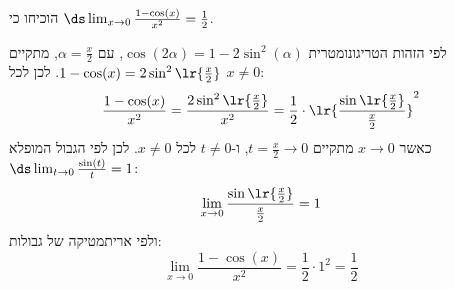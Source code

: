הוכיחו כי $\ds\lim_{x\to0}\frac{1-\cos(x)}{x^2}=\frac12$.
\ifsol
{}
\begin{solbox}
לפי הזהות הטריגונומטרית $\cos(2\alpha)=1-2\sin^2(\alpha)$, עם $\alpha=\frac x2$, מתקיים $1-\cos(x)=2\sin^2\lr{\frac x2}$. לכן לכל $x\ne0$:
\[\frac{1-\cos(x)}{x^2}=\frac{2\sin^2\lr{\frac x2}}{x^2}=\frac12\cdot\lr{\frac{\sin\lr{\frac x2}}{\frac x2}}^2\]
כאשר $x\to0$ מתקיים $t=\frac x2\to0$, ו-$t\ne0$ לכל $x\ne0$. לכן לפי הגבול המופלא $\ds\lim_{t\to0}\frac{\sin(t)}{t}=1$:
\[\lim_{x\to0}\frac{\sin\lr{\frac x2}}{\frac x2}=1\]
ולפי אריתמטיקה של גבולות:
\[\lim_{x\to0}\frac{1-\cos(x)}{x^2}=\frac12\cdot1^2=\frac12\]
\end{solbox}
\fi
